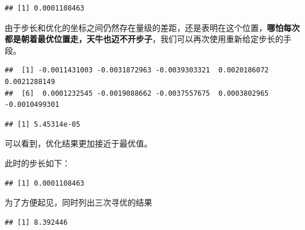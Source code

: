 \documentclass[]{ctexbook}
\newenvironment{Shaded}{\begin{snugshade}}{\end{snugshade}}
\newcommand{\KeywordTok}[1]{\textcolor[rgb]{0.13,0.29,0.53}{\textbf{#1}}}
\newcommand{\DataTypeTok}[1]{\textcolor[rgb]{0.13,0.29,0.53}{#1}}
\newcommand{\DecValTok}[1]{\textcolor[rgb]{0.00,0.00,0.81}{#1}}
\newcommand{\StringTok}[1]{\textcolor[rgb]{0.31,0.60,0.02}{#1}}
\newcommand{\OperatorTok}[1]{\textcolor[rgb]{0.81,0.36,0.00}{\textbf{#1}}}
\newcommand{\NormalTok}[1]{#1}
\begin{document}
\begin{verbatim}
## [1] 0.0001108463
\end{verbatim}

由于步长和优化的坐标之间仍然存在量级的差距，还是表明在这个位置，\textbf{哪怕每次都是朝着最优位置走，天牛也迈不开步子}，我们可以再次使用重新给定步长的手段。

\begin{Shaded}
\end{Shaded}

\begin{verbatim}
##  [1] -0.0011431003 -0.0031872963 -0.0039303321  0.0020186072  0.0021288149
##  [6]  0.0001232545 -0.0019088662 -0.0037557675  0.0003802965 -0.0010499301
\end{verbatim}

\begin{verbatim}
## [1] 5.45314e-05
\end{verbatim}

可以看到，优化结果更加接近于最优值。

此时的步长如下：

\begin{Shaded}
\end{Shaded}

\begin{verbatim}
## [1] 0.0001108463
\end{verbatim}

为了方便起见，同时列出三次寻优的结果

\begin{Shaded}
\end{Shaded}

\begin{verbatim}
## [1] 8.392446
\end{verbatim}
\end{document}
